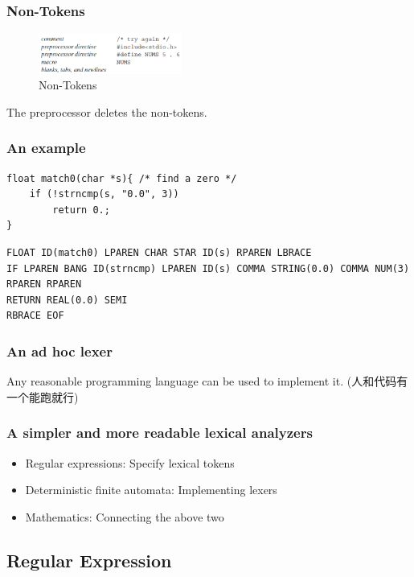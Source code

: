 \subsubsection{Non-Tokens}
\begin{figure}[!htb]
    \centering
    \includegraphics[width=0.42\textwidth]{pic/CP2/Non-Tokens}
    \caption{Non-Tokens}
\end{figure}
The preprocessor deletes the non-tokens.

\subsubsection{An example}
\begin{verbatim}
float match0(char *s){ /* find a zero */
    if (!strncmp(s, "0.0", 3))
        return 0.;
}
\end{verbatim}

\begin{verbatim}
FLOAT ID(match0) LPAREN CHAR STAR ID(s) RPAREN LBRACE 
IF LPAREN BANG ID(strncmp) LPAREN ID(s) COMMA STRING(0.0) COMMA NUM(3) RPAREN RPAREN 
RETURN REAL(0.0) SEMI 
RBRACE EOF
\end{verbatim}



\subsubsection{An ad hoc lexer}
Any reasonable programming language can be used to implement it. (人和代码有一个能跑就行)

\subsubsection{A simpler and more readable lexical analyzers}
\begin{itemize}
    \item Regular expressions: Specify lexical tokens
    \item Deterministic finite automata: Implementing lexers
    \item Mathematics: Connecting the above two
\end{itemize}

\subsection{Regular Expression}
